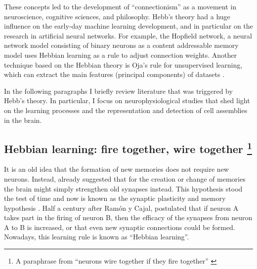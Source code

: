   These concepts led to the development of ``connectionism'' as a movement in
  neuroscience, cognitive sciences, and philosophy. Hebb's theory had a huge
  influence on the early-day machine learning development, and in particular on
  the research in artificial neural networks. For example, the Hopfield
  network, a neural network model consisting of binary neurons as a content
  addressable memory model \citep{Hopfield1982} uses Hebbian learning as a rule
  to adjust connection weights. Another technique based on the Hebbian theory
  is Oja's rule for unsupervised learning, which can extract the main features
  (principal components) of datasets \citep{Oja1982}.

  In the following paragraphs I briefly review literature that was triggered by
  Hebb's theory. In particular, I focus on neurophysiological studies that shed
  light on the learning processes and the representation and detection of cell
  assemblies in the brain.
  
  \subsection{Hebbian learning: fire together, wire together {\protect\footnote{A
  paraphrase from ``neurons wire together if they fire together'' \citep{Lowel1992}}}}

    It is an old idea that the formation of new memories does not require new
    neurons. Instead, already \cite{Cajal1894} suggested that for the creation
    or change of memories the brain might simply strengthen old synapses
    instead. This hypothesis stood the test of time and now is known as the
    synaptic plasticity and memory hypothesis \citep{Martin2000, Takeuchi2014}.
    Half a century after Ram\'{o}n y Cajal, \cite{Hebb49} postulated that if
    neuron A takes part in the firing of neuron B, then the efficacy of the
    synapses from neuron A to B is increased, or that even new synaptic
    connections could be formed. Nowadays, this learning rule is known as
    ``Hebbian learning''.

